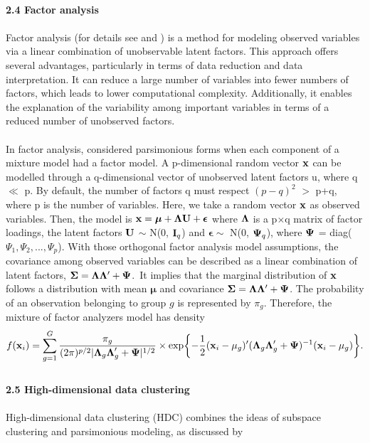 \documentclass[11pt]{article}
\begin{document}
\\
\textbf{2.4 Factor analysis}\\
\\
Factor analysis (for details see \cite{bartholomew2011latent} and \cite{spearman1961proof}) is a method for modeling observed variables via a linear combination of unobservable latent factors. This approach offers several advantages, particularly in terms of data reduction and data interpretation. It can reduce a large number of variables into fewer numbers of factors, which leads to lower computational complexity. Additionally, it enables the explanation of the variability among important variables in terms of a reduced number of unobserved factors.\\
\\
In factor analysis, \cite{mcnicholas2008parsimonious} considered parsimonious forms when each component of a mixture model had a factor model. A p-dimensional random vector $\bold{x}$ can be modelled through a q-dimensional vector of unobserved latent factors u, where q $\ll$ p. By default, the number of factors q must respect $(p-q)^2$ $>$ p+q, where p is the number of variables. Here, we take a random vector $\bold{x}$ as observed variables. Then, the model is $\bold{x = \boldsymbol{\mu} + \Lambda U + \boldsymbol{\epsilon}}$ where $\bold{\Lambda}$ is a p$\times$q matrix of factor loadings, the latent factors $\bold{U}$ $\sim$ N(0, $\bold{I}_q$) and $\boldsymbol{\epsilon} \sim$ N(0, $\bold{\Psi}_q$), where $\bold{\Psi}$ = diag($\Psi_1,\Psi_2, ..., \Psi_p$). With those orthogonal factor analysis model assumptions, the covariance among observed variables can be described as a linear combination of latent factors, $\bold{\Sigma = \Lambda\Lambda'+\Psi}$.\
It implies that the marginal distribution of $\bold{x}$ follows a distribution with mean $\boldsymbol{\mu}$ and covariance $\bold{\Sigma = \Lambda\Lambda'+\Psi}$. The probability of an observation belonging to group $g$ is represented by $\pi_g$. Therefore, the mixture of factor analyzers model has density
$$f(\bold{x}_i) = \sum_{g=1}^G\frac{\pi_g}{(2\pi)^{p/2}|\boldsymbol{\Lambda}_g\boldsymbol{\Lambda}_g'+\boldsymbol{\Psi}|^{1/2}}\times \text{exp}\biggl\{ -\frac{1}{2}(\bold{x}_i-\mu_g)'(\boldsymbol{\Lambda}_g\boldsymbol{\Lambda}_g'+\boldsymbol{\Psi})^{-1}(\bold{x}_i-\mu_g)\biggr\}.$$
\\
\textbf{2.5 High-dimensional data clustering}\\
\\
High-dimensional data clustering (HDC) combines the ideas of subspace clustering and parsimonious modeling, as discussed by \citet{bouveyron2007high}
\end{document}
